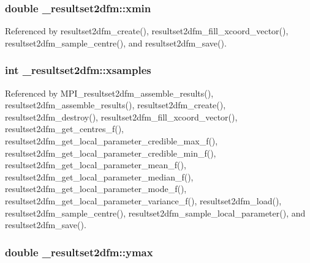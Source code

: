 \subsubsection[{\texorpdfstring{xmin}{xmin}}]{\setlength{\rightskip}{0pt plus 5cm}double \+\_\+resultset2dfm\+::xmin}\hypertarget{struct__resultset2dfm_a5aa4092375b3b85dcb9c259f2b66e373}{}\label{struct__resultset2dfm_a5aa4092375b3b85dcb9c259f2b66e373}


Referenced by resultset2dfm\+\_\+create(), resultset2dfm\+\_\+fill\+\_\+xcoord\+\_\+vector(), resultset2dfm\+\_\+sample\+\_\+centre(), and resultset2dfm\+\_\+save().

\subsubsection[{\texorpdfstring{xsamples}{xsamples}}]{\setlength{\rightskip}{0pt plus 5cm}int \+\_\+resultset2dfm\+::xsamples}\hypertarget{struct__resultset2dfm_a1ab88a600539720d2d868411fb7f5815}{}\label{struct__resultset2dfm_a1ab88a600539720d2d868411fb7f5815}


Referenced by M\+P\+I\+\_\+resultset2dfm\+\_\+assemble\+\_\+results(), resultset2dfm\+\_\+assemble\+\_\+results(), resultset2dfm\+\_\+create(), resultset2dfm\+\_\+destroy(), resultset2dfm\+\_\+fill\+\_\+xcoord\+\_\+vector(), resultset2dfm\+\_\+get\+\_\+centres\+\_\+f(), resultset2dfm\+\_\+get\+\_\+local\+\_\+parameter\+\_\+credible\+\_\+max\+\_\+f(), resultset2dfm\+\_\+get\+\_\+local\+\_\+parameter\+\_\+credible\+\_\+min\+\_\+f(), resultset2dfm\+\_\+get\+\_\+local\+\_\+parameter\+\_\+mean\+\_\+f(), resultset2dfm\+\_\+get\+\_\+local\+\_\+parameter\+\_\+median\+\_\+f(), resultset2dfm\+\_\+get\+\_\+local\+\_\+parameter\+\_\+mode\+\_\+f(), resultset2dfm\+\_\+get\+\_\+local\+\_\+parameter\+\_\+variance\+\_\+f(), resultset2dfm\+\_\+load(), resultset2dfm\+\_\+sample\+\_\+centre(), resultset2dfm\+\_\+sample\+\_\+local\+\_\+parameter(), and resultset2dfm\+\_\+save().

\subsubsection[{\texorpdfstring{ymax}{ymax}}]{\setlength{\rightskip}{0pt plus 5cm}double \+\_\+resultset2dfm\+::ymax}\hypertarget{struct__resultset2dfm_ab3acec5e7979e516689f4e724f70a537}{}\label{struct__resultset2dfm_ab3acec5e7979e516689f4e724f70a537}


